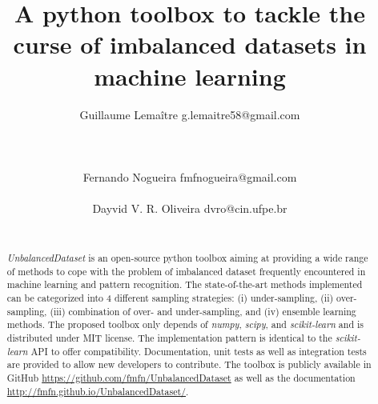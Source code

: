 \documentclass[twoside,11pt]{article}
\begin{document}
\title{A python toolbox to tackle the curse of imbalanced datasets in machine learning}
\author{Guillaume Lema\^itre \email g.lemaitre58@gmail.com \\ 
     \\ 
     \\ 
     \\ 
        \AND
        Fernando Nogueira \email fmfnogueira@gmail.com \\ 
         \\ 
        \AND
        Dayvid V. R. Oliveira \email dvro@cin.ufpe.br \\ 
         \\ 
        } 
\editor{-}

\maketitle

\begin{abstract}
\emph{UnbalancedDataset} is an open-source python toolbox aiming at providing a wide range of methods to cope with the problem of imbalanced dataset frequently encountered in machine learning and pattern recognition.
The state-of-the-art methods implemented can be categorized into 4 different sampling strategies: (i) under-sampling, (ii) over-sampling, (iii) combination of over- and under-sampling, and (iv) ensemble learning methods.
The proposed toolbox only depends of \emph{numpy}, \emph{scipy}, and \emph{scikit-learn} and is distributed under MIT license.
The implementation pattern is identical to the \emph{scikit-learn} API to offer compatibility.
Documentation, unit tests as well as integration tests are provided to allow new developers to contribute.
The toolbox is publicly available in GitHub \url{https://github.com/fmfn/UnbalancedDataset} as well as the documentation \url{http://fmfn.github.io/UnbalancedDataset/}.
\end{abstract}
\end{document}
